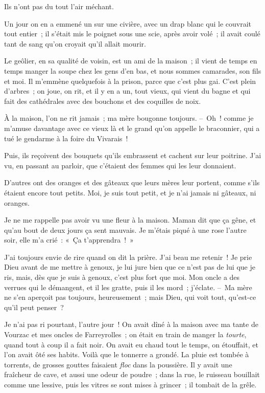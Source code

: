 \documentclass[french,twoside]{book} %
\begin{document}
Ils n’ont pas du tout l’air méchant.\par
Un jour on en a emmené un sur une civière, avec un drap blanc qui le couvrait tout entier ; il s’était mis le poignet sous une scie, après avoir volé ; il avait coulé tant de sang qu’on croyait qu’il allait mourir.\par
Le geôlier, en sa qualité de voisin, est un ami de la maison ; il vient de temps en temps manger la soupe chez les gens d’en bas, et nous sommes camarades, son fils et moi. Il m’emmène quelquefois à la prison, parce que c’est plus gai. C’est plein d’arbres ; on joue, on rit, et il y en a un, tout vieux, qui vient du bagne et qui fait des cathédrales avec des bouchons et des coquilles de noix.\par
À la maison, l’on ne rit jamais ; ma mère bougonne toujours. – Oh ! comme je m’amuse davantage avec ce vieux là et le grand qu’on appelle le braconnier, qui a tué le gendarme à la foire du Vivarais !\par
Puis, ils reçoivent des bouquets qu’ils embrassent et cachent sur leur poitrine. J’ai vu, en passant au parloir, que c’étaient des femmes qui les leur donnaient.\par
D’autres ont des oranges et des gâteaux que leurs mères leur portent, comme s’ils étaient encore tout petits. Moi, je suis tout petit, et je n’ai jamais ni gâteaux, ni oranges.\par
Je ne me rappelle pas avoir vu une fleur à la maison. Maman dit que ça gêne, et qu’au bout de deux jours ça sent mauvais. Je m’étais piqué à une rose l’autre soir, elle m’a crié : « Ça t’apprendra ! »\par
\bigbreak
\noindent J’ai toujours envie de rire quand on dit la prière. J’ai beau me retenir ! Je prie Dieu avant de me mettre à genoux, je lui jure bien que ce n’est pas de lui que je ris, mais, dès que je suis à genoux, c’est plus fort que moi. Mon oncle a des verrues qui le démangent, et il les gratte, puis il les mord ; j’éclate. – Ma mère ne s’en aperçoit pas toujours, heureusement ; mais Dieu, qui voit tout, qu’est-ce qu’il peut penser ?\par
Je n’ai pas ri pourtant, l’autre jour ! On avait dîné à la maison avec ma tante de Vourzac et mes oncles de Farreyrolles ; on était en train de manger la \emph{tourte}, quand tout à coup il a fait noir. On avait eu chaud tout le temps, on étouffait, et l’on avait ôté ses habits. Voilà que le tonnerre a grondé. La pluie est tombée à torrents, de grosses gouttes faisaient \emph{floc} dans la poussière. Il y avait une fraîcheur de cave, et aussi une odeur de poudre ; dans la rue, le ruisseau bouillait comme une lessive, puis les vitres se sont mises à grincer ; il tombait de la grêle.\par
\end{document}
